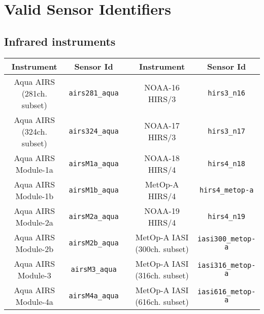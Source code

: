 \chapter{Valid Sensor Identifiers}
\label{sec:sensor_id}

\clearpage
\section{Infrared instruments}
\label{sec:infrared_instruments_sensor_id}

\begin{table}[htp]
  \centering
  \begin{tabular}{c c c c c}
    \hline
    \sffamily\textbf{Instrument} & \sffamily\textbf{Sensor Id} & \hspace{0.2cm} & \sffamily\textbf{Instrument} & \sffamily\textbf{Sensor Id} \\
    \hline\hline
Aqua AIRS (281ch. subset) & \texttt{airs281\_aqua}   & \hspace{0.2cm} & NOAA-16 HIRS/3               & \texttt{hirs3\_n16}        \\
Aqua AIRS (324ch. subset) & \texttt{airs324\_aqua}   & \hspace{0.2cm} & NOAA-17 HIRS/3               & \texttt{hirs3\_n17}        \\
Aqua AIRS Module-1a       & \texttt{airsM1a\_aqua}   & \hspace{0.2cm} & NOAA-18 HIRS/4               & \texttt{hirs4\_n18}        \\
Aqua AIRS Module-1b       & \texttt{airsM1b\_aqua}   & \hspace{0.2cm} & MetOp-A HIRS/4               & \texttt{hirs4\_metop-a}    \\
Aqua AIRS Module-2a       & \texttt{airsM2a\_aqua}   & \hspace{0.2cm} & NOAA-19 HIRS/4               & \texttt{hirs4\_n19}        \\
Aqua AIRS Module-2b       & \texttt{airsM2b\_aqua}   & \hspace{0.2cm} & MetOp-A IASI (300ch. subset) & \texttt{iasi300\_metop-a}  \\
Aqua AIRS Module-3        & \texttt{airsM3\_aqua}    & \hspace{0.2cm} & MetOp-A IASI (316ch. subset) & \texttt{iasi316\_metop-a}  \\
Aqua AIRS Module-4a       & \texttt{airsM4a\_aqua}   & \hspace{0.2cm} & MetOp-A IASI (616ch. subset) & \texttt{iasi616\_metop-a}  \\

\end{tabular}
\end{table}

